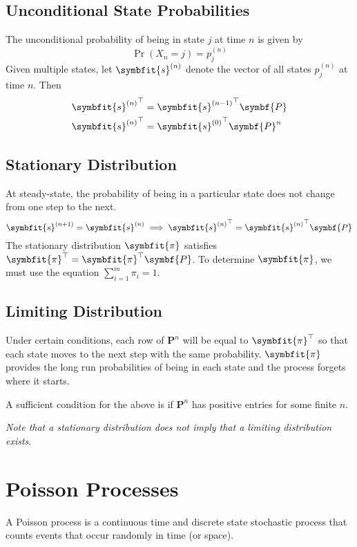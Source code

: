 \documentclass{article}
\begin{document}
\begin{multicols}{3}
    \subsection{Unconditional State Probabilities}
    The unconditional probability of being in state \(j\) at time \(n\)
    is given by
    \begin{equation*}
        \Pr{\left( X_n = j \right)} = p_j^{\left( n \right)}
    \end{equation*}
    Given multiple states, let \(\symbfit{s}^{\left( n \right)}\) denote the vector of all states \(p_j^{\left( n \right)}\) at
    time \(n\). Then
    \begin{align*}{\symbfit{s}^{\left( n \right)}}^\top & = {\symbfit{s}^{\left( n-1 \right)}}^\top \symbf{P} \\
              {\symbfit{s}^{\left( n \right)}}^\top & = {\symbfit{s}^{\left( 0 \right)}}^\top \symbf{P}^n
    \end{align*}
    \subsection{Stationary Distribution}
    At steady-state, the probability of being in a particular state
    does not change from one step to the next.
    \begin{equation*}
        \symbfit{s}^{\left( n+1 \right)} = \symbfit{s}^{\left( n \right)} \implies {\symbfit{s}^{\left( n \right)}}^\top = {\symbfit{s}^{\left( n \right)}}^\top \symbf{P}
    \end{equation*}
    The stationary distribution \(\symbfit{\pi}\) satisfies \(\symbfit{\pi}^\top = \symbfit{\pi}^\top \symbf{P}\).
    To determine \(\symbfit{\pi}\), we must use the equation \(\sum_{i = 1}^m \pi_i = 1\).
    \subsection{Limiting Distribution}
    Under certain conditions, each row of \(\symbf{P}^n\) will be equal
    to \(\symbfit{\pi}^\top\) so that each state moves to the next step
    with the same probability. \(\symbfit{\pi}\) provides the long run
    probabilities of being in each state and the process forgets where
    it starts.

    A sufficient condition for the above is if \(\symbf{P}^n\) has
    positive entries for some finite \(n\).

    \textit{Note that a stationary distribution does not imply that a limiting distribution exists}.
    \section{Poisson Processes}
    A Poisson process is a continuous time and discrete state
    stochastic process that counts events that occur randomly in time
    (or space).


\end{multicols}
\end{document}
